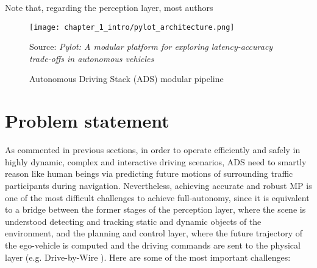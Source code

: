 Note that, regarding the perception layer, most authors \cite{yurtsever2020survey, }
 
\begin{figure}[h]
	\centering
	\texttt{[image: chapter\_1\_intro/pylot\_architecture.png]}
	\caption{Autonomous Driving Stack (ADS) modular pipeline}
	Source: \textit{Pylot: A modular platform for exploring latency-accuracy trade-offs in autonomous vehicles} \cite{gog2021pylot}
	\label{fig:chapter_1_intro/pylot_architecture}
\end{figure}

\section{Problem statement}
\label{sec:1_problem_statement}

As commented in previous sections, in order to operate efficiently and safely in highly dynamic, complex and interactive driving scenarios, \acs{ADS} need to smartly reason like human beings via predicting future motions of surrounding traffic participants during navigation. Nevertheless, achieving accurate and robust \ac{MP} is one of the most difficult challenges to achieve full-autonomy, since it is equivalent to a bridge between the former stages of the perception layer, where the scene is understood detecting and tracking static and dynamic objects of the environment, and the planning and control layer, where the future trajectory of the ego-vehicle is computed and the driving commands are sent to the physical layer (e.g. Drive-by-Wire \cite{arango2020drive}). Here are some of the most important challenges: 

